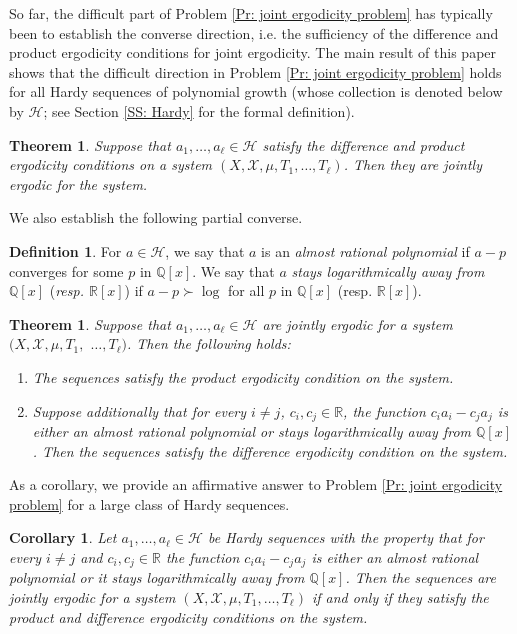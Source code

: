 \documentclass[11pt]{amsart}
\newtheorem{theorem}[lemma]{Theorem}
\newtheorem{corollary}[lemma]{Corollary}
\theoremstyle{definition}
\newtheorem{definition}[lemma]{Definition}
\newcommand{\Q}{{\mathbb Q}}
\newcommand{\R}{{\mathbb R}}
\newcommand{\CH}{{\mathcal H}}
\newcommand{\CX}{{\mathcal X}}
\newcommand{\1}{{\mathbf{1}}}
\begin{document}
So far, the difficult part of Problem \ref{Pr: joint ergodicity problem} has typically been to establish the converse direction, i.e. the sufficiency of the difference and product ergodicity conditions for joint ergodicity. The main result of this paper shows that the difficult direction in Problem \ref{Pr: joint ergodicity problem} holds for all Hardy sequences of polynomial growth (whose collection is denoted below by $\CH$; see Section \ref{SS: Hardy} for the formal definition). 
\begin{theorem}\label{T: main theorem}
    Suppose that $a_{1},\dots,a_{\ell}\in\mathcal{H}$ satisfy the difference and product ergodicity conditions on a system $(X, \CX, \mu, T_1, \ldots, T_\ell)$.
Then they are jointly ergodic for the system.
     \end{theorem}
We also establish the following partial converse.

\begin{definition}
    For $a\in\mathcal{H}$, we say that $a$ is an \emph{almost rational %
    polynomial} if $a-p$ converges for some $p$ in $\Q[x]$. %
    We say that $a$ \emph{stays logarithmically away from $\Q[x]$} (\emph{resp. $\R[x]$}) if $a-p\succ \log$ for all $p$ in $\Q[x]$ (resp. $\R[x]$).
\end{definition}

\begin{theorem}\label{T: easy direction}
        Suppose that $a_{1},\dots,a_{\ell}\in\mathcal{H}$ are jointly ergodic for a system $(X, \CX, \mu, T_1, $ $ \ldots, T_\ell)$. Then the following holds:
        \begin{enumerate}
            \item The sequences satisfy the product ergodicity condition on the system.
            \item Suppose additionally that for every $i\neq j$, $c_i, c_j\in\R$, the function $c_i a_i - c_j a_j$ is either an almost rational polynomial  or stays logarithmically away from $\Q[x]$. Then the sequences satisfy the difference ergodicity condition on the system.
        \end{enumerate}
\end{theorem}



As a corollary, we provide an affirmative answer to Problem \ref{Pr: joint ergodicity problem} for a large class of Hardy sequences.
\begin{corollary}\label{C:np}
    Let $a_1, \ldots, a_\ell\in\CH$ be Hardy sequences with the property that for every $i\neq j$ and $c_i, c_j\in\R$ the function $c_i a_i - c_j a_j$ is either an almost rational polynomial or it stays logarithmically away from $\Q[x]$. Then the sequences are jointly ergodic for a system $(X, \CX, \mu, T_1, \ldots, T_\ell)$ if and only  if they satisfy the product and difference ergodicity conditions on the system. 
\end{corollary}
\end{document}
